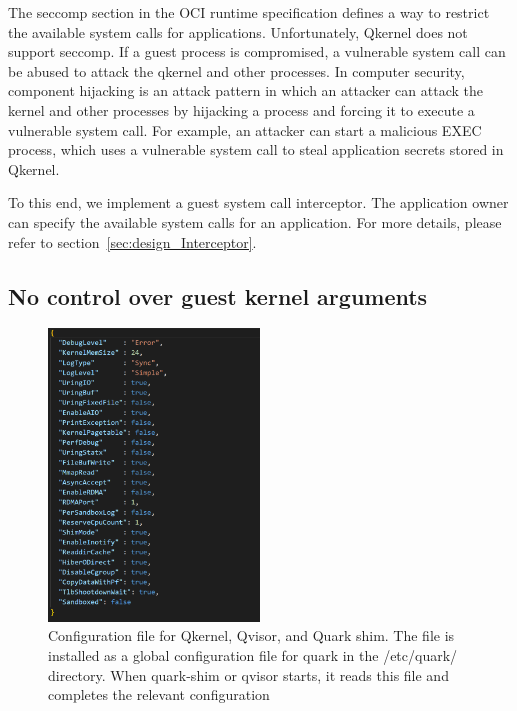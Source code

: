 The seccomp section in the OCI runtime specification\cite*{oci-spec} defines a way to restrict the available system calls for applications. Unfortunately, Qkernel does not support seccomp\cite*{seccomp}. If a guest process is compromised, a vulnerable 
system call can be abused to attack the qkernel and other processes. In computer security, component hijacking\cite*{DBLP:journals/corr/WuGLD16} is an attack pattern in which an attacker can attack the kernel and other processes by hijacking a 
process and forcing it to execute a vulnerable system call. For example, an attacker can start a malicious EXEC process,  which uses a vulnerable system call to steal application secrets stored in Qkernel. 

To this end, we implement a guest system call interceptor. The application owner can specify the available system calls for an application. For more details, please refer to section~\ref*{sec:design_Interceptor}.

\subsection{No control over guest kernel arguments}
\begin{figure}[H]
  \centering
  \includegraphics[width=0.5\textwidth,height=0.4\textheight]{images/quark_config.PNG}
  \caption[Configuration file for Qkernel, Qvisor, and Quark shim]{Configuration file for Qkernel, Qvisor, and Quark shim. The file is installed as a global configuration file for quark in the /etc/quark/ directory. When quark-shim or qvisor starts, it reads this file and completes the relevant configuration}
  \label{fig:quark_config}
\end{figure}

